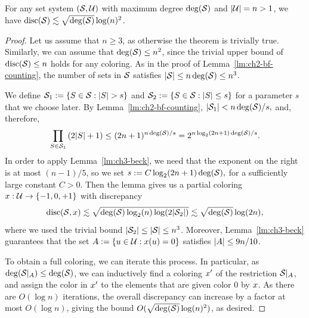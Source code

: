 \begin{theorem}\label{thm:ch3-bf-weak}
  For any set system \((\mathcal{S}, \mathcal{U})\) with maximum degree
  \(\operatorname{deg}(\mathcal{S})\) and \(|\mathcal{U}| = n > 1\), 
  we have \(\operatorname{disc}(\mathcal{S}) \lesssim \sqrt{\operatorname{deg}(\mathcal{S})} \log(n)^{2}\). 
\end{theorem}
\begin{proof}
  Let us assume that \(n \ge 3\), as otherwise the theorem is
  trivially true. Similarly, we can assume
  that \(\operatorname{deg}(\mathcal{S}) \le n^2\), since the trivial upper
  bound of \(\operatorname{disc}(\mathcal{S}) \le n\) holds for any coloring.
  As in the proof of Lemma~\ref{lm:ch2-bf-counting}, 
  the number of sets in \(\mathcal{S}\) satisfies \(|\mathcal{S}| \leq n\operatorname{deg}(\mathcal{S}) \le
  n^3\). 
  
  We define \(\mathcal{S}_1 := \{S \in \mathcal{S}: |S| > s\}\) and
  \(\mathcal{S}_2 := \{S \in \mathcal{S}: |S| \le s\}\) for a parameter
  \(s\) that we choose later. By Lemma~\ref{lm:ch2-bf-counting},
  \(
  |\mathcal{S}_1| < n\operatorname{deg}(\mathcal{S})/s,
  \)
  and, therefore,
  \[
    \prod_{S \in \mathcal{S}_1}{(2|S| + 1)} \le (2n+1)^{n\operatorname{deg}(\mathcal{S})/s}
    = 2^{n\log_2(2n+1)\operatorname{deg}(\mathcal{S})/s}.
  \]
  In order to apply Lemma~\ref{lm:ch3-beck}, we need that the exponent
  on the right is at most \((n-1)/5\), so we set
  \(
  s := C\log_2(2n+1) \operatorname{deg}(\mathcal{S}),
  \)
  for a sufficiently large constant $C>0$.
  Then the lemma gives us a partial coloring \(x:\mathcal{U} \to \{-1, 0,
  +1\}\) with discrepancy
  \[
    \operatorname{disc}(\mathcal{S}, x) \lesssim  \sqrt{\operatorname{deg}(\mathcal{S})\log_2(n) \log(2|\mathcal{S}_2|)}
    \lesssim  \sqrt{\operatorname{deg}(\mathcal{S})} \log(2n),
  \]
   where we used the trivial
  bound \(|\mathcal{S}_2| \le |\mathcal{S}| \le  n^3\). Moreover,
  Lemma~\ref{lm:ch3-beck} guarantees that the set \(A :=
  \{u \in \mathcal{U}: x(u) = 0\}\) satisfies \(|A|
  \le 9n/10\).

  To obtain a full coloring, we can iterate this process. In
  particular, as $\operatorname{deg}(\mathcal{S}|_A) \le \operatorname{deg}(\mathcal{S})$, we can
  inductively
  find a coloring \(x'\) of the restriction \(\mathcal{S}|_A\), and assign the color in $x'$ to the elements that are given color $0$ by $x$. As there are $O(\log n)$ iterations, the overall discrepancy can increase by a factor at most $O(\log n)$, giving the bound $O(\sqrt{\operatorname{deg}(\mathcal{S})}\log(n)^2)$, as desired. 
\end{proof}


